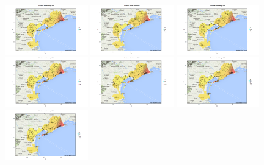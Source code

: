 \documentclass[a4paper,11pt,twoside,openright]{book}							%
\begin{document}
\begin{figure}[H]
\includegraphics[trim=0cm 0cm 4cm 0cm,clip=true,width=0.32\textwidth]{Immagini/venezia_con_covariate/Maps2002.png}
\includegraphics[trim=0cm 0cm 4cm 0cm,clip=true,width=0.32\textwidth]{Immagini/venezia_con_covariate/Maps2003.png}
\includegraphics[trim=0cm 0cm 4cm 0cm,clip=true,width=0.32\textwidth]{Immagini/venezia_con_covariate/Maps2004.png}
\includegraphics[trim=0cm 0cm 4cm 0cm,clip=true,width=0.32\textwidth]{Immagini/venezia_con_covariate/Maps2005.png}
\includegraphics[trim=0cm 0cm 4cm 0cm,clip=true,width=0.32\textwidth]{Immagini/venezia_con_covariate/Maps2006.png}
\includegraphics[trim=0cm 0cm 4cm 0cm,clip=true,width=0.32\textwidth]{Immagini/venezia_con_covariate/Maps2007.png}
\includegraphics[trim=0cm 0cm 4cm 0cm,clip=true,width=0.32\textwidth]{Immagini/venezia_con_covariate/Maps2008.png}

\end{figure}
\end{document}
